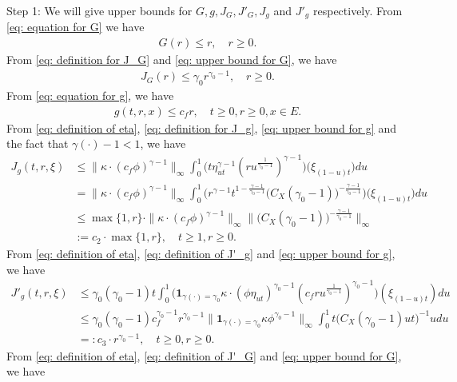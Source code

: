 	Step 1:
	We will give upper bounds for $G,g, J_G, J'_G, J_g$ and $J'_g$ respectively.
	From \eqref{eq: equation for G} we have
\begin{align}\label{eq: upper bound for G}
	G(r)
	\leq r,
	\quad r \geq 0.
\end{align}	
	From \eqref{eq: definition for J_G} and \eqref{eq: upper bound for G}, we have
\begin{align}\label{eq: upper bound for J_G}
	J_G(r)
	\leq \gamma_0 r^{\gamma_0 - 1},
	\quad r \geq 0.
\end{align}
	From \eqref{eq: equation for g}, we have
\begin{align}\label{eq: upper bound for g}
	g(t,r, x) \leq c_f r,
	\quad t\geq 0, r \geq 0, x\in E.
\end{align}
	From \eqref{eq: definition of eta}, \eqref{eq: definition for J_g}, \eqref{eq: upper bound for g} and the fact that $\gamma(\cdot) - 1 < 1$, we have
\begin{align}
	J_g(t,r, \xi)
	&\leq \|\kappa \cdot (c_f\phi)^{\gamma - 1} \|_\infty \int_0^1 \big(  t\eta_{ut}^{\gamma - 1} (ru^{\frac{1}{\gamma_0 - 1}} )^{\gamma-1}  \big) \big(  \xi_{(1-u)t} \big) du
	\\&= \| \kappa \cdot (c_f\phi)^{\gamma - 1} \|_\infty \int_0^1 \big(  r^{\gamma - 1}t^{1-\frac{\gamma - 1}{\gamma_0 - 1}}  \big( C_X (\gamma_0 - 1) \big)^{-\frac{\gamma - 1}{\gamma_0 - 1}}  \big) \big( \xi_{(1-u)t} \big) du
	\\& \leq \max\{1,r\} \cdot \| \kappa \cdot (c_f\phi)^{\gamma - 1} \|_\infty \Big\|  \big( C_X (\gamma_0 - 1) \big)^{-\frac{\gamma - 1}{\gamma_0 - 1}}\Big\|_\infty
	\\& := c_2 \cdot \max  \{1,r\},
	\quad t\geq 1, r\geq 0.
\end{align}
	From \eqref{eq: definition of eta}, \eqref{eq: definition of J'_g} and \eqref{eq: upper bound for g}, we have
\begin{align}
	J'_g(t,r,\xi)
	&\leq \gamma_0 (\gamma_0 - 1) t \int_0^1 \big( \mathbf 1_{\gamma(\cdot) = \gamma_0} \kappa \cdot (\phi \eta_{ut})^{\gamma_0 - 1} (c_f ru^{\frac{1}{\gamma_0 - 1}})^{\gamma_0 - 1}\big) (\xi_{(1-u)t}) du
	\\&\leq \gamma_0(\gamma_0 - 1) c_f^{\gamma_0 - 1}r^{\gamma_0 - 1} \|  \mathbf 1_{\gamma(\cdot) = \gamma_0}  \kappa \phi^{\gamma_0 - 1} \|_\infty \int_0^1 t \big( C_X(\gamma_0 - 1) ut \big)^{- 1}  u  du
	\\&=: c_3 \cdot r^{\gamma_0 - 1},
	\quad t\geq 0, r\geq 0.
\end{align}
	From \eqref{eq: definition of eta}, \eqref{eq: definition of J'_G} and \eqref{eq: upper bound for G}, we have
